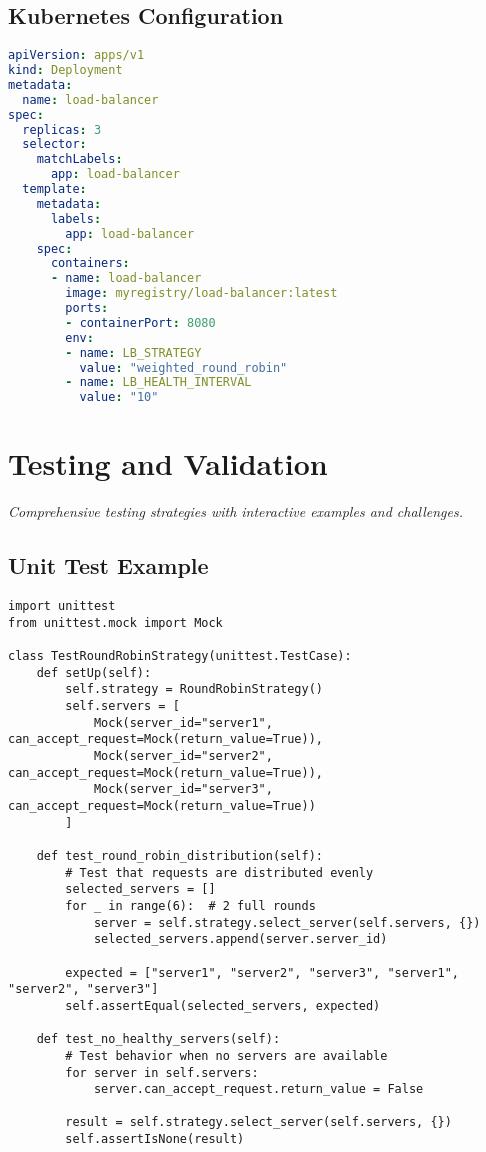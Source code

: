 \documentclass[12pt,a4paper]{article}
\begin{document}
\subsection{Kubernetes Configuration}

\begin{lstlisting}[language=yaml, caption=Kubernetes Deployment]
apiVersion: apps/v1
kind: Deployment
metadata:
  name: load-balancer
spec:
  replicas: 3
  selector:
    matchLabels:
      app: load-balancer
  template:
    metadata:
      labels:
        app: load-balancer
    spec:
      containers:
      - name: load-balancer
        image: myregistry/load-balancer:latest
        ports:
        - containerPort: 8080
        env:
        - name: LB_STRATEGY
          value: "weighted_round_robin"
        - name: LB_HEALTH_INTERVAL
          value: "10"
\end{lstlisting}

\section{Testing and Validation}
\label{sec:testing}

\textit{Comprehensive testing strategies with interactive examples and challenges.}

\subsection{Unit Test Example}
\label{subsec:unittests}

\begin{lstlisting}[caption=Unit Test for Round Robin Strategy]
import unittest
from unittest.mock import Mock

class TestRoundRobinStrategy(unittest.TestCase):
    def setUp(self):
        self.strategy = RoundRobinStrategy()
        self.servers = [
            Mock(server_id="server1", can_accept_request=Mock(return_value=True)),
            Mock(server_id="server2", can_accept_request=Mock(return_value=True)),
            Mock(server_id="server3", can_accept_request=Mock(return_value=True))
        ]
    
    def test_round_robin_distribution(self):
        # Test that requests are distributed evenly
        selected_servers = []
        for _ in range(6):  # 2 full rounds
            server = self.strategy.select_server(self.servers, {})
            selected_servers.append(server.server_id)
        
        expected = ["server1", "server2", "server3", "server1", "server2", "server3"]
        self.assertEqual(selected_servers, expected)
    
    def test_no_healthy_servers(self):
        # Test behavior when no servers are available
        for server in self.servers:
            server.can_accept_request.return_value = False
        
        result = self.strategy.select_server(self.servers, {})
        self.assertIsNone(result)
\end{lstlisting}
\end{document}
